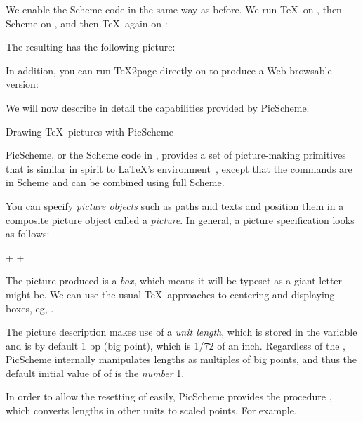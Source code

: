 We enable the \p{\eval} Scheme code in
 the same way as before.  We run
\TeX\ on , then Scheme on
, and then \TeX\ again on
:


\n The resulting  has the
following picture:

\quote

\endquote

\n In addition, you can run \TeX2page directly on
 to produce a Web-browsable
version:


We will now describe in detail the capabilities
provided by PicScheme.

 Drawing \TeX\ pictures with PicScheme


PicScheme, or the Scheme code in ,
provides a set of picture-making primitives that is
similar in spirit to La\TeX's 
environment~\cite[ch.~7]{latex}, except that the
commands are in Scheme and can be combined using full
Scheme.

You can specify {\em picture objects} such as
paths and texts and position
them in a composite picture object called a {\em picture}.
In general, a picture specification looks as follows:

\p+
+

\n The picture produced is a {\em box}, which means it
will be typeset as a giant letter might be.
We can use the usual \TeX\ approaches to centering and
displaying boxes, eg, \p{\centerline}.


The picture description makes use of a {\em unit
length}, which is stored in the variable 
and is by default 1 bp (big point), which is 1/72 of an inch.
Regardless of the , PicScheme
internally manipulates lengths as multiples of big
points, and thus the default initial value of
of  is the {\em number} 1.


In order to allow the resetting of  easily,
PicScheme provides the procedure , which converts
lengths in other units to scaled points.  For example,


